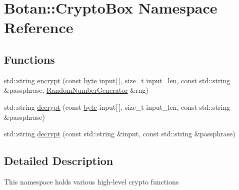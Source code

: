 \hypertarget{namespaceBotan_1_1CryptoBox}{\section{Botan\-:\-:Crypto\-Box Namespace Reference}
\label{namespaceBotan_1_1CryptoBox}
}
\subsection*{Functions}
\begin{DoxyCompactItemize}
\item 
std\-::string \hyperlink{namespaceBotan_1_1CryptoBox_a55daa4172fbea4e59eb8cc05fd21c996}{encrypt} (const \hyperlink{namespaceBotan_a7d793989d801281df48c6b19616b8b84}{byte} input\mbox{[}$\,$\mbox{]}, size\-\_\-t input\-\_\-len, const std\-::string \&passphrase, \hyperlink{classBotan_1_1RandomNumberGenerator}{Random\-Number\-Generator} \&rng)
\item 
std\-::string \hyperlink{namespaceBotan_1_1CryptoBox_a9340ab7c5c4c49ba5375232d8a6eef47}{decrypt} (const \hyperlink{namespaceBotan_a7d793989d801281df48c6b19616b8b84}{byte} input\mbox{[}$\,$\mbox{]}, size\-\_\-t input\-\_\-len, const std\-::string \&passphrase)
\item 
std\-::string \hyperlink{namespaceBotan_1_1CryptoBox_a9d2c4e2543d9ebf79b6146c50165689f}{decrypt} (const std\-::string \&input, const std\-::string \&passphrase)
\end{DoxyCompactItemize}


\subsection{Detailed Description}
This namespace holds various high-\/level crypto functions 

